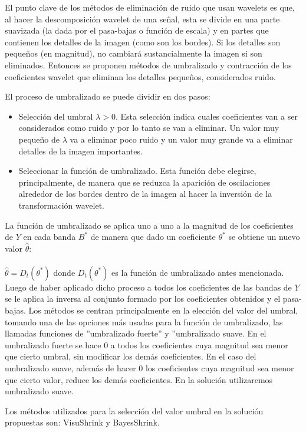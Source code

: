 \documentclass[a4paper,10pt,twocolumn]{article}
\begin{document}
 El punto clave de los métodos de eliminación de ruido que usan wavelets es que, al hacer la descomposición wavelet de una señal, esta se divide en una parte suavizada (la dada por el pasa-bajas o función de escala) y en partes que contienen los detalles de la imagen (como son los bordes). Si los detalles son pequeños (en magnitud), no cambiará sustancialmente la imagen si son eliminados. Entonces se proponen métodos de umbralizado y contracción de los coeficientes wavelet que eliminan los detalles pequeños, considerados ruido.
 
 El proceso de umbralizado se puede dividir en dos pasos:
\begin{itemize}
\item Selección del umbral $\lambda > 0$. Esta selección indica cuales coeficientes van a ser considerados como ruido y por lo tanto se van a eliminar. Un valor muy pequeño de $\lambda$ va a eliminar poco ruido y un valor muy grande va a eliminar detalles de la imagen importantes.
\item Seleccionar la función de umbralizado. Esta función debe elegirse, principalmente, de manera que se reduzca la aparición de oscilaciones alrededor de los bordes dentro de la imagen al hacer la inversión de la transformación wavelet.
\end{itemize}

 La función de umbralizado se aplica uno a uno a la magnitud de los coeficientes de $Y$ en cada banda $B^*$ de manera que
dado un coeficiente $\theta^*$ se obtiene un nuevo valor
$\hat{\theta}$:\\\\ 
$\hat{\theta} = D_t(\theta^*)$
donde $D_t(\theta^*)$ es la función de umbralizado antes mencionada. Luego de haber aplicado dicho proceso a todos los coeficientes de las bandas de $Y$ se le aplica la inversa al conjunto formado por los coeficientes obtenidos y el pasa-bajas.
Los métodos se centran principalmente en la elección del valor del umbral, tomando una de las opciones más usadas para la función de umbralizado, las llamadas funciones de ”umbralizado fuerte” y ”umbralizado suave. En el umbralizado fuerte se hace 0 a todos los coeficientes cuya magnitud sea menor que cierto umbral, sin modificar los demás coeficientes. En el caso del umbralizado suave, además de hacer 0 los coeficientes cuya magnitud sea menor que cierto valor, reduce los demás coeficientes.
En la solución utilizaremos umbralizado suave. 

 Los métodos utilizados para la selección del valor umbral en la solución propuestas son: VisuShrink y BayesShrink.
 
\end{document}
